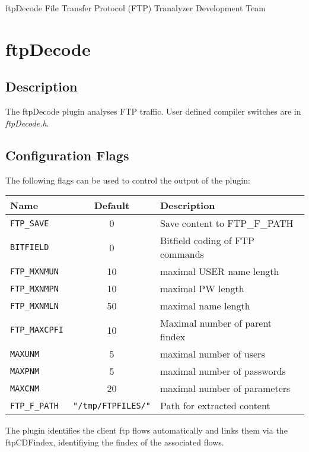 \documentclass[documentation]{subfiles}
\begin{document}
\trantitle
    {ftpDecode}
    {File Transfer Protocol (FTP)}
    {Tranalyzer Development Team} %

\section{ftpDecode}\label{s:ftpDecode}

\subsection{Description}
The ftpDecode plugin analyses FTP traffic. User defined compiler switches are in {\em ftpDecode.h}.

\subsection{Configuration Flags}
The following flags can be used to control the output of the plugin:
\begin{longtable}{lcl}
    \toprule
    {\bf Name} & {\bf Default} & {\bf Description}\\
    \midrule\endhead%
    {\tt FTP\_SAVE}    &  0 & Save content to FTP\_F\_PATH\\
    {\tt BITFIELD}     &  0 & Bitfield coding of FTP commands\\
    {\tt FTP\_MXNMUN}  & 10 & maximal USER name length\\
    {\tt FTP\_MXNMPN}  & 10 & maximal PW length\\
    {\tt FTP\_MXNMLN}  & 50 & maximal name length\\
    {\tt FTP\_MAXCPFI} & 10 & Maximal number of parent findex\\
    {\tt MAXUNM}       &  5 & maximal number of users\\
    {\tt MAXPNM}       &  5 & maximal number of passwords\\
    {\tt MAXCNM}       & 20 & maximal number of parameters\\
    {\tt FTP\_F\_PATH} & {\tt\small "/tmp/FTPFILES/"} & Path for extracted content\\
    \bottomrule
\end{longtable}

The plugin identifies the client ftp flows automatically and links them via the ftpCDFindex, identifiying
the findex of the associated flows.
\end{document}
